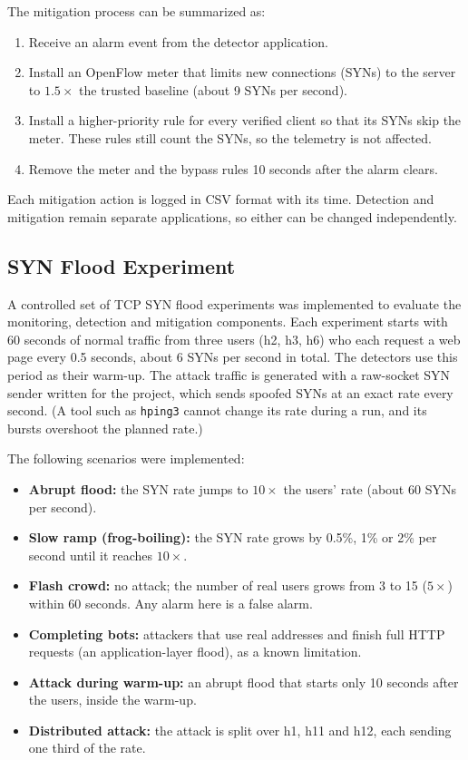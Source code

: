 \documentclass[12pt,a4paper]{article}
\begin{document}
The mitigation process can be summarized as:
\begin{enumerate}
  \item Receive an alarm event from the detector application.
  \item Install an OpenFlow meter that limits new connections (SYNs) to the
  server to $1.5\times$ the trusted baseline (about 9 SYNs per second).
  \item Install a higher-priority rule for every verified client so that its
  SYNs skip the meter. These rules still count the SYNs, so the telemetry is
  not affected.
  \item Remove the meter and the bypass rules 10 seconds after the alarm
  clears.
\end{enumerate}
Each mitigation action is logged in CSV format with its time. Detection and
mitigation remain separate applications, so either can be changed
independently.

\subsection{SYN Flood Experiment}
A controlled set of TCP SYN flood experiments was implemented to evaluate the
monitoring, detection and mitigation components. Each experiment starts with 60
seconds of normal traffic from three users (h2, h3, h6) who each request a web
page every 0.5 seconds, about 6 SYNs per second in total. The detectors use
this period as their warm-up. The attack traffic is generated with a raw-socket
SYN sender written for the project, which sends spoofed SYNs at an exact rate
every second. (A tool such as \texttt{hping3} cannot change its rate during a
run, and its bursts overshoot the planned rate.)

The following scenarios were implemented:
\begin{itemize}
  \item \textbf{Abrupt flood:} the SYN rate jumps to $10\times$ the users' rate
  (about 60 SYNs per second).
  \item \textbf{Slow ramp (frog-boiling):} the SYN rate grows by 0.5\%, 1\% or
  2\% per second until it reaches $10\times$.
  \item \textbf{Flash crowd:} no attack; the number of real users grows from 3
  to 15 ($5\times$) within 60 seconds. Any alarm here is a false alarm.
  \item \textbf{Completing bots:} attackers that use real addresses and finish
  full HTTP requests (an application-layer flood), as a known limitation.
  \item \textbf{Attack during warm-up:} an abrupt flood that starts only 10
  seconds after the users, inside the warm-up.
  \item \textbf{Distributed attack:} the attack is split over h1, h11 and h12,
  each sending one third of the rate.
\end{itemize}
\end{document}
